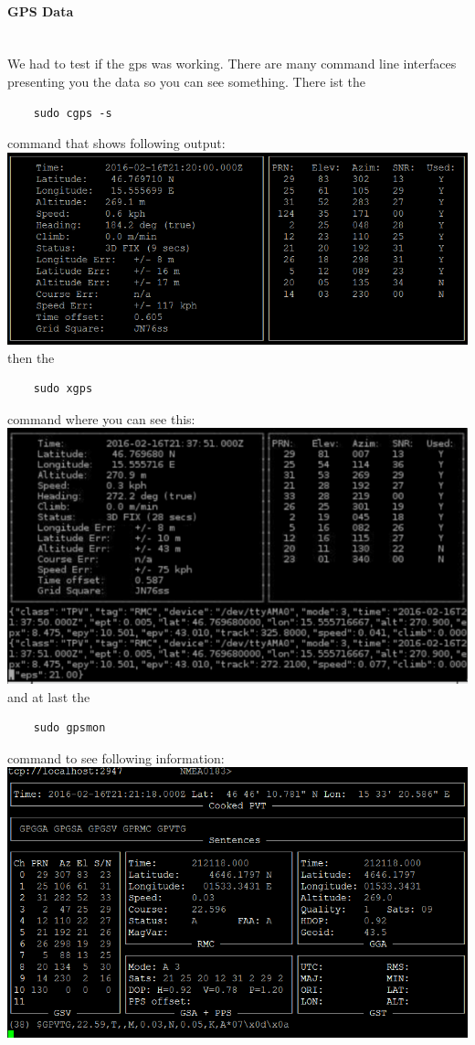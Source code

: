 \paragraph{GPS Data} \mbox{}\\
We had to test if the \gls{gps} was working. There are many command line interfaces presenting you the data so you can see something.\newline
There ist the 
\begin{verbatim}
	sudo cgps -s
\end{verbatim}
command that shows following output: \newline
\includegraphics[scale=0.7]{bilder/scr1}
\newline
then the
\begin{verbatim}
	sudo xgps
\end{verbatim}
command where you can see this:\newline
\includegraphics[scale=0.9]{bilder/scr2}
\newline
and at last the 
\begin{verbatim}
	sudo gpsmon
\end{verbatim}
command to see following information: \newline
\includegraphics[scale=0.7]{bilder/scr3}
